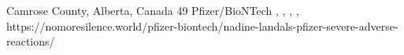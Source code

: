           {
            Camrose County, Alberta, Canada
          }
          {
            49
          }
          {
            Pfizer/BioNTech
          }
          {
          }
          {
            ,
            ,
            ,
            ,
          }
          {
            https://nomoresilence.world/pfizer-biontech/nadine-landals-pfizer-severe-adverse-reactions/
          }

